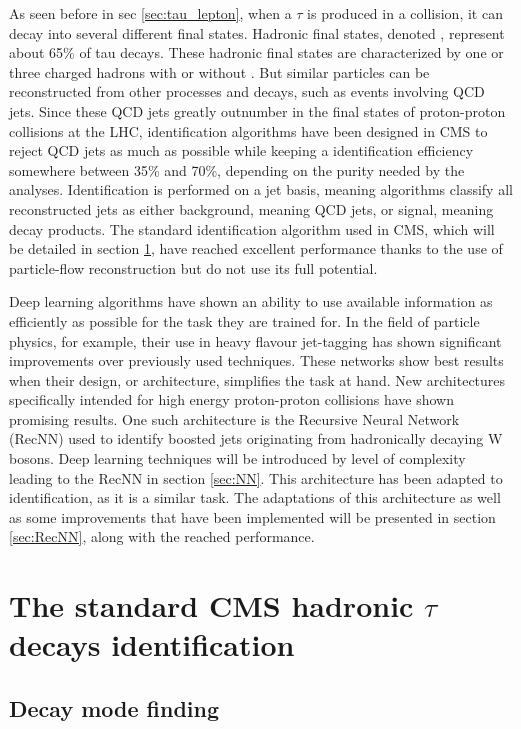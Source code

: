 
As seen before in sec \ref{sec:tau_lepton}, when a $\tau$ is produced in a collision, it can decay into several different final states.
Hadronic final states, denoted \tauh, represent about 65\% of tau decays.
These hadronic final states are characterized by one or three charged hadrons with or without \pizero . But similar particles can be reconstructed from other processes and decays, such as events involving QCD jets.
Since these QCD jets greatly outnumber \tauh in the final states of proton-proton collisions at the LHC, \tauh identification algorithms have been designed in CMS to reject QCD jets as much as possible while keeping a \tauh identification efficiency somewhere between 35\% and 70\%, depending on the purity needed by the analyses. Identification is performed on a jet basis, meaning algorithms classify all reconstructed jets as either background, meaning QCD jets, or signal, meaning \tauh decay products.
The standard \tauh identification algorithm used in CMS, which will be detailed in section \ref{sec:std_tau_id}, have reached excellent performance thanks to the use of particle-flow reconstruction but do not use its full potential. 

Deep learning algorithms have shown an ability to use available information as efficiently as possible for the task they are trained for. In the field of particle physics, for example, their use in heavy flavour jet-tagging \cite{btagging_NN} has shown significant improvements over previously used techniques. These networks show best results when their design, or architecture, simplifies the task at hand. New architectures specifically intended for high energy proton-proton collisions have shown promising results. One such architecture is the Recursive Neural Network (RecNN) \cite{Louppe:2017ipp} used to identify boosted jets originating from hadronically decaying W bosons. Deep learning techniques will be introduced by level of complexity leading to the RecNN in section \ref{sec:NN}. This architecture has been adapted to \tauh identification, as it is a similar task. The adaptations of this architecture as well as some improvements that have been implemented will be presented in section \ref{sec:RecNN}, along with the reached performance.

\section{The standard CMS hadronic $\tau$ decays identification}
\label{sec:std_tau_id}
\subsection{Decay mode finding}

